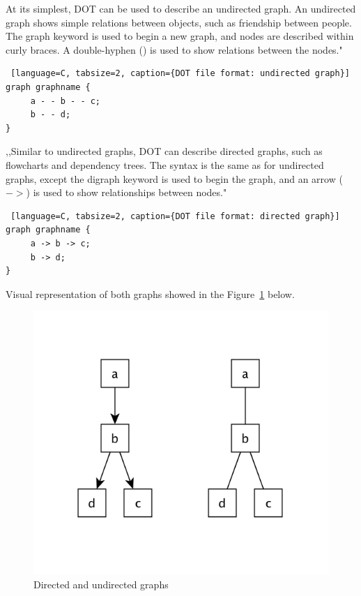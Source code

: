 At its simplest, DOT can be used to describe an undirected graph. An undirected graph shows simple relations between objects, such as friendship between people. The graph keyword is used to begin a new graph, and nodes are described within curly braces. A double-hyphen (\textendash \textendash) is used to show relations between the nodes."~\cite{DOT}

\begin{center}
\begin{lstlisting} [language=C, tabsize=2, caption={DOT file format: undirected graph}]
graph graphname {
     a - - b - - c;
     b - - d;
}
\end{lstlisting}
\end{center}

,,Similar to undirected graphs, DOT can describe directed graphs, such as flowcharts and dependency trees. The syntax is the same as for undirected graphs, except the digraph keyword is used to begin the graph, and an arrow ($->$) is used to show relationships between nodes."~\cite{DOT}

\begin{center}
\begin{lstlisting} [language=C, tabsize=2, caption={DOT file format: directed graph}]
graph graphname {
     a -> b -> c;
     b -> d;
}
\end{lstlisting}
\end{center}

Visual representation of both graphs showed in the Figure~\ref{fig:dot_graphs} below.

\begin{figure}[h!]
\centering
\includegraphics[scale=0.3]{pictures/dot_graph.png}
\caption{Directed and undirected graphs}
\label{fig:dot_graphs}
\end{figure}

